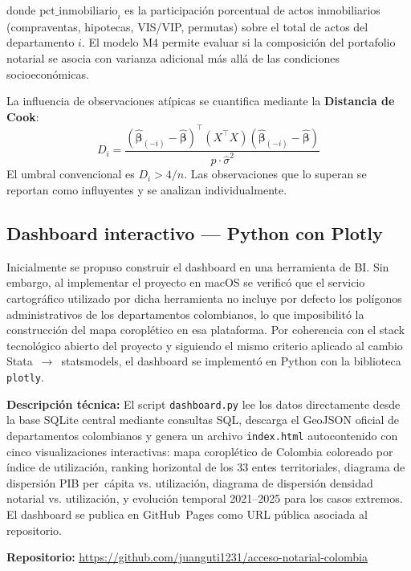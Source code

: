 \documentclass{article}
\begin{document}
\noindent donde $\text{pct\_inmobiliario}_i$ es la participación porcentual
de actos inmobiliarios (compraventas, hipotecas, VIS/VIP, permutas)
sobre el total de actos del departamento $i$. El modelo M4 permite
evaluar si la composición del portafolio notarial se asocia con
varianza adicional más allá de las condiciones socioeconómicas.

\medskip
\noindent La influencia de observaciones atípicas se cuantifica
mediante la \textbf{Distancia de Cook}:
\begin{equation}
D_i = \frac{(\hat{\boldsymbol{\beta}}_{(-i)} - \hat{\boldsymbol{\beta}})^{\top}
            (X^{\top}X)
            (\hat{\boldsymbol{\beta}}_{(-i)} - \hat{\boldsymbol{\beta}})}
           {p \cdot \hat{\sigma}^2}
\end{equation}
\noindent El umbral convencional es $D_i > 4/n$. Las observaciones que
lo superan se reportan como influyentes y se analizan individualmente.

\subsection{Dashboard interactivo — Python con Plotly}

Inicialmente se propuso construir el dashboard en una herramienta de
BI. Sin embargo, al implementar el proyecto en macOS se verificó que
el servicio cartográfico utilizado por dicha herramienta no incluye
por defecto los polígonos administrativos de los departamentos
colombianos, lo que imposibilitó la construcción del mapa coroplético
en esa plataforma. Por coherencia con el stack tecnológico abierto
del proyecto y siguiendo el mismo criterio aplicado al cambio
Stata~$\to$~statsmodels, el dashboard se implementó en Python con
la biblioteca \texttt{plotly}.

\textbf{Descripción técnica:} El script \texttt{dashboard.py} lee
los datos directamente desde la base SQLite central mediante consultas
SQL, descarga el GeoJSON oficial de departamentos colombianos y genera
un archivo \texttt{index.html} autocontenido con cinco visualizaciones
interactivas: mapa coroplético de Colombia coloreado por índice de
utilización, ranking horizontal de los 33 entes territoriales,
diagrama de dispersión PIB per~cápita vs. utilización, diagrama de
dispersión densidad notarial vs. utilización, y evolución temporal
2021--2025 para los casos extremos. El dashboard se publica en
GitHub~Pages como URL pública asociada al repositorio.

\textbf{Repositorio:}
\url{https://github.com/juanguti1231/acceso-notarial-colombia}
\end{document}
